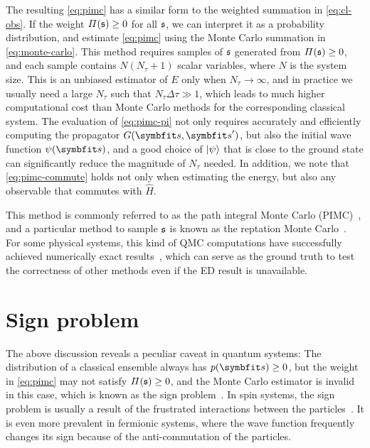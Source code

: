 The resulting \cref{eq:pimc} has a similar form to the weighted summation in \cref{eq:cl-obs}. If the weight $\varPi(\mathfrak{s}) \ge 0$ for all $\mathfrak{s}$, we can interpret it as a probability distribution, and estimate \cref{eq:pimc} using the Monte Carlo summation in \cref{eq:monte-carlo}. This method requires samples of $\mathfrak{s}$ generated from $\varPi(\mathfrak{s}) \ge 0$, and each sample contains $N (N_\tau + 1)$ scalar variables, where $N$ is the system size. This is an unbiased estimator of $E$ only when $N_\tau \to \infty$, and in practice we usually need a large $N_\tau$ such that $N_\tau \Delta \tau \gg 1$, which leads to much higher computational cost than Monte Carlo methods for the corresponding classical system. The evaluation of \cref{eq:pimc-pi} not only requires  accurately and efficiently computing the propagator $G(\vs, \vs')$, but also the initial wave function $\psi(\vs)$, and a good choice of $\ket{\psi}$ that is close to the ground state can significantly reduce the magnitude of $N_\tau$ needed. In addition, we note that \cref{eq:pimc-commute} holds not only when estimating the energy, but also any observable that commutes with $\hat{H}$.

This method is commonly referred to as the path integral Monte Carlo (PIMC)~\cite{barker1979quantum, raedt1985monte}, and a particular method to sample $\mathfrak{s}$ is known as the reptation Monte Carlo~\cite{baroni1999reptation}. For some physical systems, this kind of QMC computations have successfully achieved numerically exact results~\cite{todo2001cluster}, which can serve as the ground truth to test the correctness of other methods even if the ED result is unavailable.

\section{Sign problem}
\label{sec:sign-problem}

The above discussion reveals a peculiar caveat in quantum systems: The distribution of a classical ensemble always has $p(\vs) \ge 0$, but the weight in \cref{eq:pimc} may not satisfy $\varPi(\mathfrak{s}) \ge 0$, and the Monte Carlo estimator is invalid in this case, which is known as the sign problem~\cite{loh1990sign, troyer2005computational}. In spin systems, the sign problem is usually a result of the frustrated interactions between the particles~\cite{henelius2000sign}. It is even more prevalent in fermionic systems, where the wave function frequently changes its sign because of the anti-commutation of the particles.

